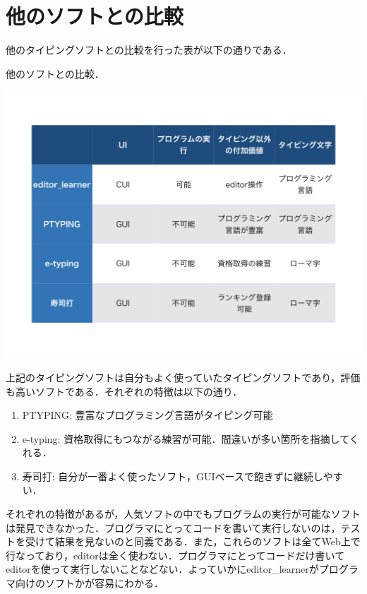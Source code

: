 \chapter{他のソフトとの比較}\label{ux4ed6ux306eux30bdux30d5ux30c8ux3068ux306eux6bd4ux8f03}

    他のタイピングソフトとの比較を行った表が以下の通りである．

\begin{table}[H]
\centering
\begin{center}
\caption{他のソフトとの比較．\label{compare}}
\includegraphics[width=150mm]{../../picture/compare.jpeg}
\end{center}

\label{fig:}
\end{table}

上記のタイピングソフトは自分もよく使っていたタイピングソフトであり，評価も高いソフトである．それぞれの特徴は以下の通り．

\begin{enumerate}
\def\labelenumi{\arabic{enumi}.}
\tightlist
\item
PTYPING: 豊富なプログラミング言語がタイピング可能
\item
e-typing: 資格取得にもつながる練習が可能．間違いが多い箇所を指摘してくれる．
\item
寿司打: 自分が一番よく使ったソフト，GUIベースで飽きずに継続しやすい．
\end{enumerate}

それぞれの特徴があるが，人気ソフトの中でもプログラムの実行が可能なソフトは発見できなかった．プログラマにとってコードを書いて実行しないのは，テストを受けて結果を見ないのと同義である．また，これらのソフトは全てWeb上で行なっており，editorは全く使わない．プログラマにとってコードだけ書いてeditorを使って実行しないことなどない．よっていかにeditor\_learnerがプログラマ向けのソフトかが容易にわかる．

